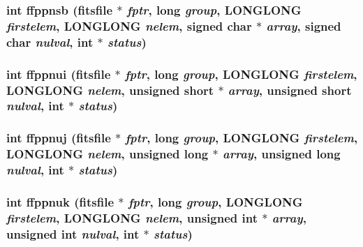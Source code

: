 \subsubsection{\setlength{\rightskip}{0pt plus 5cm}int ffppnsb (\bf{fitsfile} $\ast$ {\em fptr}, long {\em group}, \bf{LONGLONG} {\em firstelem}, \bf{LONGLONG} {\em nelem}, signed char $\ast$ {\em array}, signed char {\em nulval}, int $\ast$ {\em status})}\label{src_2fitsio_8h_d663bf4dbce34e909c2eb15c2da1a376}


\subsubsection{\setlength{\rightskip}{0pt plus 5cm}int ffppnui (\bf{fitsfile} $\ast$ {\em fptr}, long {\em group}, \bf{LONGLONG} {\em firstelem}, \bf{LONGLONG} {\em nelem}, unsigned short $\ast$ {\em array}, unsigned short {\em nulval}, int $\ast$ {\em status})}\label{src_2fitsio_8h_525842763bdaa4507a3a935d347a0462}


\subsubsection{\setlength{\rightskip}{0pt plus 5cm}int ffppnuj (\bf{fitsfile} $\ast$ {\em fptr}, long {\em group}, \bf{LONGLONG} {\em firstelem}, \bf{LONGLONG} {\em nelem}, unsigned long $\ast$ {\em array}, unsigned long {\em nulval}, int $\ast$ {\em status})}\label{src_2fitsio_8h_fc1d4fc6ae72ad09956653077c3813af}


\subsubsection{\setlength{\rightskip}{0pt plus 5cm}int ffppnuk (\bf{fitsfile} $\ast$ {\em fptr}, long {\em group}, \bf{LONGLONG} {\em firstelem}, \bf{LONGLONG} {\em nelem}, unsigned int $\ast$ {\em array}, unsigned int {\em nulval}, int $\ast$ {\em status})}\label{src_2fitsio_8h_95d87d24a1245de2f3cb4178a78cac04}


